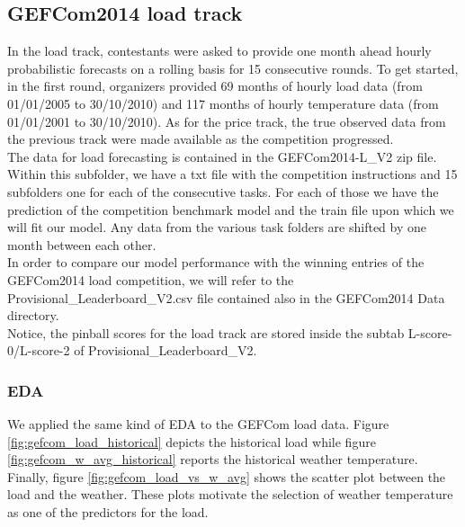 \subsection{GEFCom2014 load track}
In the load track, contestants were asked to provide one month ahead hourly probabilistic forecasts on a rolling basis for 15 consecutive rounds. To get started, in the first round, organizers provided 69 months of hourly load data (from 01/01/2005 to 30/10/2010) and 117 months of hourly temperature data (from 01/01/2001 to 30/10/2010). 
As for the price track, the true observed data from the previous track were made available as the competition progressed.
\\
The data for load forecasting is contained in the GEFCom2014-L\_V2 zip file. Within this subfolder, we have a txt file with the competition instructions and 15 subfolders one for each of the consecutive tasks. For each of those we have the prediction of the competition benchmark model and the train file upon which we will fit our model.
Any data from the various task folders are shifted by one month between each other.
\\
In order to compare our model performance with the winning entries of the GEFCom2014 load competition, we will refer to the Provisional\_Leaderboard\_V2.csv file contained also in the GEFCom2014 Data directory.
\\
Notice, the pinball scores for the load track are stored inside the subtab L-score-0/L-score-2 of Provisional\_Leaderboard\_V2.
\subsubsection{EDA}
We applied the same kind of EDA to the GEFCom load data. Figure \ref{fig:gefcom_load_historical} depicts the historical load while figure \ref{fig:gefcom_w_avg_historical} reports the historical weather temperature. Finally, figure \ref{fig:gefcom_load_vs_w_avg} shows the scatter plot between the load and the weather.
These plots motivate the selection of weather temperature as one of the predictors for the load.

